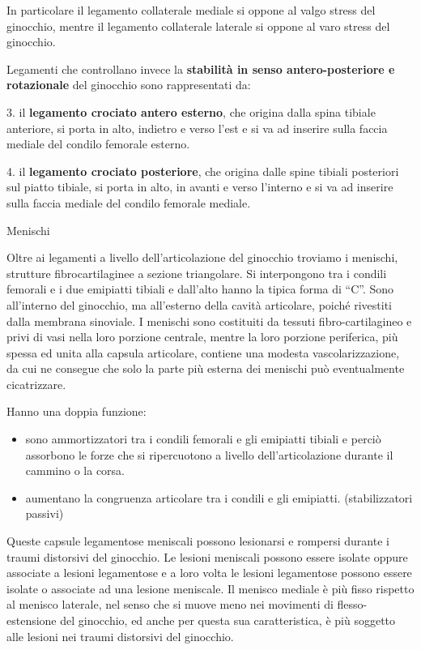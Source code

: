 \documentclass[]{article}
\begin{document}
In particolare il legamento collaterale mediale si oppone al valgo
stress del ginocchio, mentre il legamento collaterale laterale si oppone
al varo stress del ginocchio.

Legamenti che controllano invece la \textbf{stabilità in senso
antero-posteriore e rotazionale} del ginocchio sono rappresentati da:

3. il \textbf{legamento crociato antero esterno}, che origina dalla
spina tibiale anteriore, si porta in alto, indietro e verso l'est e si
va ad inserire sulla faccia mediale del condilo femorale esterno.

4. il \textbf{legamento crociato posteriore}, che origina dalle spine
tibiali posteriori sul piatto tibiale, si porta in alto, in avanti e
verso l'interno e si va ad inserire sulla faccia mediale del condilo
femorale mediale.

Menischi

Oltre ai legamenti a livello dell'articolazione del ginocchio troviamo i
menischi, strutture fibrocartilaginee a sezione triangolare. Si
interpongono tra i condili femorali e i due emipiatti tibiali e
dall'alto hanno la tipica forma di ``C''. Sono all'interno del
ginocchio, ma all'esterno della cavità articolare, poiché rivestiti
dalla membrana sinoviale. I menischi sono costituiti da tessuti
fibro-cartilagineo e privi di vasi nella loro porzione centrale, mentre
la loro porzione periferica, più spessa ed unita alla capsula
articolare, contiene una modesta vascolarizzazione, da cui ne consegue
che solo la parte più esterna dei menischi può eventualmente
cicatrizzare.

Hanno una doppia funzione:

\begin{itemize}
\item
  sono ammortizzatori tra i condili femorali e gli emipiatti tibiali e
  perciò assorbono le forze che si ripercuotono a livello
  dell'articolazione durante il cammino o la corsa.
\item
  aumentano la congruenza articolare tra i condili e gli emipiatti.
  (stabilizzatori passivi)
\end{itemize}

Queste capsule legamentose meniscali possono lesionarsi e rompersi
durante i traumi distorsivi del ginocchio. Le lesioni meniscali possono
essere isolate oppure associate a lesioni legamentose e a loro volta le
lesioni legamentose possono essere isolate o associate ad una lesione
meniscale. Il menisco mediale è più fisso rispetto al menisco laterale,
nel senso che si muove meno nei movimenti di flesso-estensione del
ginocchio, ed anche per questa sua caratteristica, è più soggetto alle
lesioni nei traumi distorsivi del ginocchio.
\end{document}
